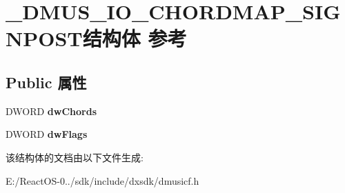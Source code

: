 \hypertarget{struct___d_m_u_s___i_o___c_h_o_r_d_m_a_p___s_i_g_n_p_o_s_t}{}\section{\+\_\+\+D\+M\+U\+S\+\_\+\+I\+O\+\_\+\+C\+H\+O\+R\+D\+M\+A\+P\+\_\+\+S\+I\+G\+N\+P\+O\+S\+T结构体 参考}
\label{struct___d_m_u_s___i_o___c_h_o_r_d_m_a_p___s_i_g_n_p_o_s_t}
\subsection*{Public 属性}
\begin{DoxyCompactItemize}
\item 
\mbox{\label{struct___d_m_u_s___i_o___c_h_o_r_d_m_a_p___s_i_g_n_p_o_s_t_aade25443ed6ecab3c55c3e0e429ee43d}} 
D\+W\+O\+RD {\bfseries dw\+Chords}
\item 
\mbox{\label{struct___d_m_u_s___i_o___c_h_o_r_d_m_a_p___s_i_g_n_p_o_s_t_a722887f7c250170f3b6644d249e66b11}} 
D\+W\+O\+RD {\bfseries dw\+Flags}
\end{DoxyCompactItemize}


该结构体的文档由以下文件生成\+:\begin{DoxyCompactItemize}
\item 
E\+:/\+React\+O\+S-\/0../sdk/include/dxsdk/dmusicf.\+h\end{DoxyCompactItemize}
